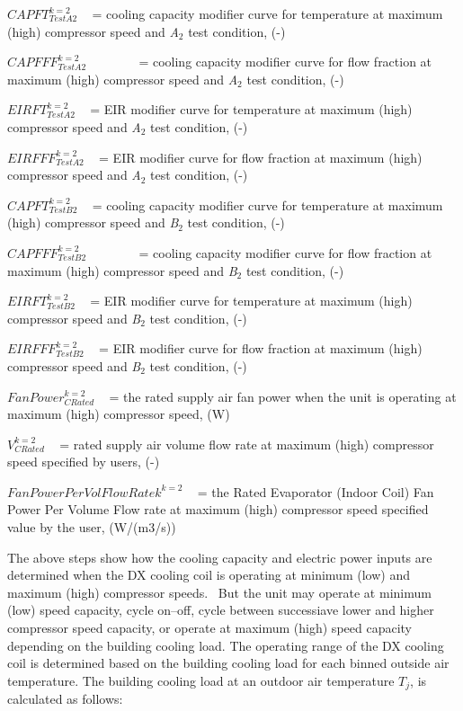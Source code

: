 \(CAPFT_{TestA2}^{k = 2}\) ~ = cooling capacity modifier curve for temperature at maximum (high) compressor speed and \emph{A}\(_{2}\) test condition, (-)

\(CAPFFF_{TestA2}^{k = 2}\) ~~~~~~~ = cooling capacity modifier curve for flow fraction at maximum (high) compressor speed and \emph{A}\(_{2}\) test condition, (-)

\(EIRFT_{TestA2}^{k = 2}\) ~ = EIR modifier curve for temperature at maximum (high) compressor speed and \emph{A}\(_{2}\) test condition, (-)

\(EIRFFF_{TestA2}^{k = 2}\) ~ = EIR modifier curve for flow fraction at maximum (high)~ compressor speed and \emph{A}\(_{2}\) test condition, (-)

\(CAPFT_{TestB2}^{k = 2}\) ~ = cooling capacity modifier curve for temperature at maximum (high) compressor speed and \emph{B}\(_{2}\) test condition, (-)

\(CAPFFF_{TestB2}^{k = 2}\) ~~~~~~~ = cooling capacity modifier curve for flow fraction at maximum (high) compressor speed and \emph{B}\(_{2}\) test condition, (-)

\(EIRFT_{TestB2}^{k = 2}\) ~ = EIR modifier curve for temperature at maximum (high) compressor speed and \emph{B}\(_{2}\) test condition, (-)

\(EIRFFF_{TestB2}^{k = 2}\) ~ = EIR modifier curve for flow fraction at maximum (high) compressor speed and \emph{B}\(_{2}\) test condition, (-)

\(FanPower_{CRated}^{k = 2}\) ~ = the rated supply air fan power when the unit is operating at maximum (high) compressor speed, (W)

\(V_{CRated}^{k = 2}\) ~ = rated supply air volume flow rate at maximum (high) compressor speed specified by users, (-)

\(FanPowerPerVolFlowRate{k^{k = 2}}\) ~ = the Rated Evaporator (Indoor Coil) Fan Power Per Volume Flow rate at maximum (high) compressor speed specified value by the user, (W/(m3/s))

The above steps show how the cooling capacity and electric power inputs are determined when the DX cooling coil is operating at minimum (low) and maximum (high) compressor speeds.~ But the unit may operate at minimum (low) speed capacity, cycle on--off, cycle between successiave lower and higher compressor speed capacity, or operate at maximum (high) speed capacity depending on the building cooling load. The operating range of the DX cooling coil is determined based on the building cooling load for each binned outside air temperature. The building cooling load at an outdoor air temperature \(T_{j}\), is calculated as follows:

